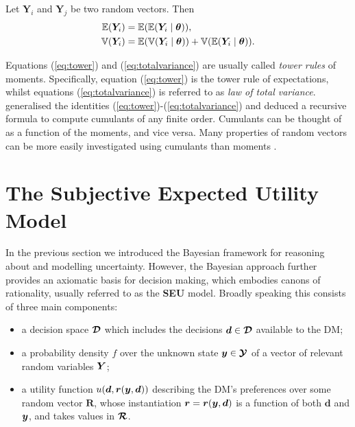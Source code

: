 \begin{proposition}
\label{prop:towerrules}
Let $\bm{Y}_i$ and $\bm{Y}_j$ be two random vectors. Then
\begin{align}
\E(\bm{Y}_i)&=\E(\E(\bm{Y}_i\;|\;\bm{\theta})),\label{eq:tower}\\
\V(\bm{Y}_i)&=\E(\V(\bm{Y}_i\;|\;\bm{\theta}))+\V(\E(\bm{Y}_i\;|\;\bm{\theta})).\label{eq:totalvariance}
\end{align}
\end{proposition}
Equations (\ref{eq:tower}) and (\ref{eq:totalvariance}) are usually called \textit{tower rules} of moments. Specifically, equation (\ref{eq:tower}) is the tower rule of expectations, whilst equations (\ref{eq:totalvariance}) is referred to as \textit{law of total variance}.
 \citet{Brillinger1969} generalised the identities (\ref{eq:tower})-(\ref{eq:totalvariance}) and deduced a recursive formula to compute cumulants of any finite order. Cumulants can be thought of as a function of the moments, and vice versa. Many properties of random vectors can be more easily investigated using cumulants than moments \citep[see e.g.][]{Zwiernik2012}.

\section{The Subjective Expected Utility Model}
\label{sec:SEU}
In the previous section we introduced the Bayesian framework for reasoning about and modelling uncertainty. However, the Bayesian approach further provides an axiomatic basis for decision making, which embodies canons of rationality, usually referred to as the \textbf{SEU} model. Broadly speaking this consists of three main components:
\begin{itemize}
\item a decision space $\bm{\mathcal{D}}$ which includes the decisions $\bm{d}\in\bm{\mathcal{D}}$ available to the DM;
\item a probability density $f$ over the unknown state $\bm{y}\in \bm{\mathcal{Y}}$ of a vector of relevant random variables $\bm{Y}$;
\item a utility function $u(\bm{d},\bm{r}(\bm{y},\bm{d}))$ describing the DM's preferences over some random vector $\bm{R}$, whose instantiation $\bm{r}=\bm{r}(\bm{y},\bm{d})$ is a function of both $\bm{d}$ and $\bm{y}$, and takes values in $\bm{\mathcal{R}}$.
\end{itemize}

